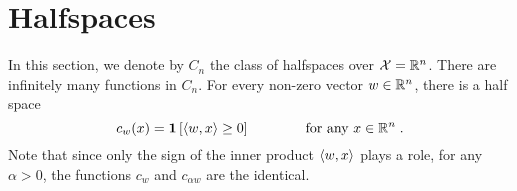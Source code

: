 \section{Halfspaces}
\label{section:halfspaces}

In this section, we denote by $C_n$ the class of halfspaces over $\mathcal{X} = \mathbb{R}^n$. There
are infinitely many functions in $C_n$. For every non-zero vector $w \in \mathbb{R}^n$, there is a half space
$$
c_w(x) = \mathbf{1}\left[{\left\langle w, x \right\rangle \ge 0}\right] \qquad \qquad \text{for any $x \in \mathbb{R}^n$} \; .
$$
Note that since only the sign of the inner product $\left\langle w, x \right\rangle$ plays a role, for
any $\alpha > 0$, the functions $c_w$ and $c_{\alpha w}$ are the identical.
